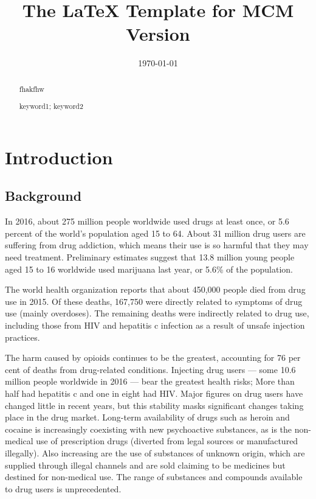 \documentclass{mcmthesis}
\title{The \LaTeX{} Template for MCM Version \MCMversion}
\author{}
\date{\today}
\begin{document}
\begin{abstract}
	fhakfhw
	\begin{keywords}
		keyword1; keyword2
	\end{keywords}
\end{abstract}
\maketitle
\tableofcontents

\newpage
\section{Introduction}

\subsection{Background}
In 2016, about 275 million people worldwide used drugs at least once, or 5.6 percent of the world's population aged 15 to 64. About 31 million drug users are suffering from drug addiction, which means their use is so harmful that they may need treatment. Preliminary estimates suggest that 13.8 million young people aged 15 to 16 worldwide used marijuana last year, or 5.6\% of the population.

The world health organization reports that about 450,000 people died from drug use in 2015. Of these deaths, 167,750 were directly related to symptoms of drug use (mainly overdoses). The remaining deaths were indirectly related to drug use, including those from HIV and hepatitis c infection as a result of unsafe injection practices.

The harm caused by opioids continues to be the greatest, accounting for 76 per cent of deaths from drug-related conditions. Injecting drug users --- some 10.6 million people worldwide in 2016 --- bear the greatest health risks; More than half had hepatitis c and one in eight had HIV. Major figures on drug users have changed little in recent years, but this stability masks significant changes taking place in the drug market. Long-term availability of drugs such as heroin and cocaine is increasingly coexisting with new psychoactive substances, as is the non-medical use of prescription drugs (diverted from legal sources or manufactured illegally). Also increasing are the use of substances of unknown origin, which are supplied through illegal channels and are sold claiming to be medicines but destined for non-medical use. The range of substances and compounds available to drug users is unprecedented.\cite{1}
\end{document}

